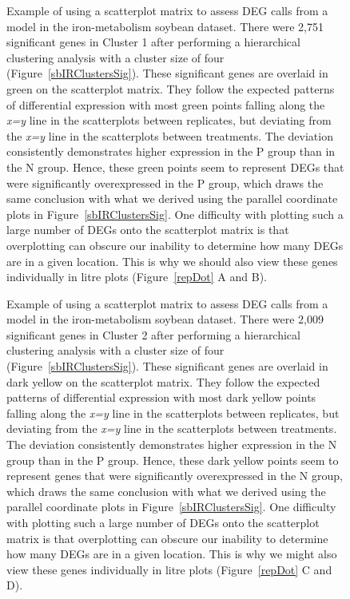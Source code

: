 \documentclass{bmcart}
\begin{document}
\begin{linenumbers}
\begin{backmatter}
\begin{figure}[h!]
\caption{
Example of using a scatterplot matrix to assess DEG calls from a model in the iron-metabolism soybean dataset. There were 2,751 significant genes in Cluster 1 after performing a hierarchical clustering analysis with a cluster size of four (Figure~\ref{sbIRClustersSig}). These significant genes are overlaid in green on the scatterplot matrix. They follow the expected patterns of differential expression with most green points falling along the \textit{x=y} line in the scatterplots between replicates, but deviating from the \textit{x=y} line in the scatterplots between treatments. The deviation consistently demonstrates higher expression in the P group than in the N group. Hence, these green points seem to represent DEGs that were significantly overexpressed in the P group, which draws the same conclusion with what we derived using the parallel coordinate plots in Figure~\ref{sbIRClustersSig}. One difficulty with plotting such a large number of DEGs onto the scatterplot matrix is that overplotting can obscure our inability to determine how many DEGs are in a given location. This is why we should also view these genes individually in litre plots (Figure~\ref{repDot} A and B).
\label{sbIRClusterSigSM1}}
\end{figure}

\begin{figure}[h!]
\caption{
Example of using a scatterplot matrix to assess DEG calls from a model in the iron-metabolism soybean dataset. There were 2,009 significant genes in Cluster 2 after performing a hierarchical clustering analysis with a cluster size of four (Figure~\ref{sbIRClustersSig}). These significant genes are overlaid in dark yellow on the scatterplot matrix. They follow the expected patterns of differential expression with most dark yellow points falling along the \textit{x=y} line in the scatterplots between replicates, but deviating from the \textit{x=y} line in the scatterplots between treatments. The deviation consistently demonstrates higher expression in the N group than in the P group. Hence, these dark yellow points seem to represent genes that were significantly overexpressed in the N group, which draws the same conclusion with what we derived using the parallel coordinate plots in Figure~\ref{sbIRClustersSig}. One difficulty with plotting such a large number of DEGs onto the scatterplot matrix is that overplotting can obscure our inability to determine how many DEGs are in a given location. This is why we might also view these genes individually in litre plots (Figure~\ref{repDot} C and D).
\label{sbIRClusterSigSM2}}
\end{figure}


\end{backmatter}
\end{linenumbers}
\end{document}
